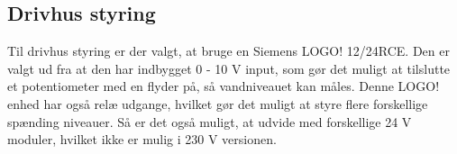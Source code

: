 \subsection{Drivhus styring}

Til drivhus styring er der valgt, at bruge en Siemens LOGO! 12/24RCE. 
Den er valgt ud fra at den har indbygget 0 - 10 V input, som gør det muligt at tilslutte et potentiometer med en flyder på, så vandniveauet kan måles.
Denne LOGO! enhed har også relæ udgange, hvilket gør det muligt at styre flere forskellige spænding niveauer.
Så er det også muligt, at udvide med forskellige 24 V moduler, hvilket ikke er mulig i 230 V versionen.